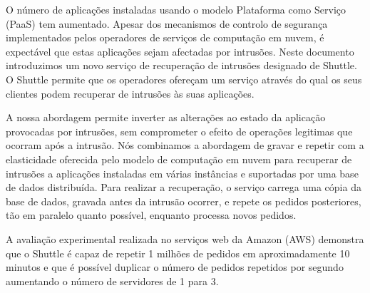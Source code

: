 
\begin{resumo}
O número de aplicações instaladas usando o modelo Plataforma como Serviço (PaaS) tem aumentado. Apesar dos mecanismos de controlo de segurança implementados pelos operadores de serviços de computação em nuvem, é expectável que estas aplicações sejam afectadas por intrusões. Neste documento introduzimos um novo serviço de recuperação de intrusões designado de Shuttle. O Shuttle permite que os operadores ofereçam um serviço através do qual os seus clientes podem recuperar de intrusões às suas aplicações.

A nossa abordagem permite inverter as alterações ao estado da aplicação provocadas por intrusões, sem comprometer o efeito de operações legitimas que ocorram após a intrusão. Nós combinamos a abordagem de gravar e repetir com a elasticidade oferecida pelo modelo de computação em nuvem para recuperar de intrusões a aplicações instaladas em várias instâncias e suportadas por uma base de dados distribuída. Para realizar a recuperação, o serviço carrega uma cópia da base de dados, gravada antes da intrusão ocorrer, e repete os pedidos posteriores, tão em paralelo quanto possível, enquanto processa novos pedidos.

A avaliação experimental realizada no serviços web da Amazon (AWS) demonstra que o Shuttle é capaz de repetir 1 milhões de pedidos em aproximadamente 10 minutos e que é possível duplicar o número de pedidos repetidos por segundo aumentando o número de servidores de 1 para 3.



\end{resumo}
